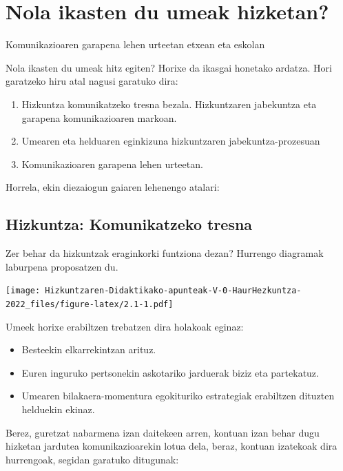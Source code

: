 \documentclass[
]{book}
\providecommand{\tightlist}{%
  \setlength{\itemsep}{0pt}\setlength{\parskip}{0pt}}
\begin{document}
\hypertarget{nola-ikasten-du-umeak-hizketan}{%
\chapter{Nola ikasten du umeak hizketan?}\label{nola-ikasten-du-umeak-hizketan}}

Komunikazioaren garapena lehen urteetan etxean eta eskolan

Nola ikasten du umeak hitz egiten? Horixe da ikasgai honetako ardatza. Hori garatzeko hiru atal nagusi garatuko dira:

\begin{enumerate}
\def\labelenumi{\arabic{enumi}.}
\tightlist
\item
  Hizkuntza komunikatzeko tresna bezala. Hizkuntzaren jabekuntza eta garapena komunikazioaren markoan.
\item
  Umearen eta helduaren eginkizuna hizkuntzaren jabekuntza-prozesuan
\item
  Komunikazioaren garapena lehen urteetan.
\end{enumerate}

Horrela, ekin diezaiogun gaiaren lehenengo atalari:

\hypertarget{hizkuntza-komunikatzeko-tresna}{%
\section{Hizkuntza: Komunikatzeko tresna}\label{hizkuntza-komunikatzeko-tresna}}

Zer behar da hizkuntzak eraginkorki funtziona dezan? Hurrengo diagramak laburpena proposatzen du.

\texttt{[image: Hizkuntzaren-Didaktikako-apunteak-V-0-HaurHezkuntza-2022\_files/figure-latex/2.1-1.pdf]}

Umeek horixe erabiltzen trebatzen dira holakoak eginaz:

\begin{itemize}
\tightlist
\item
  Besteekin elkarrekintzan arituz.
\item
  Euren inguruko pertsonekin askotariko jarduerak biziz eta partekatuz.
\item
  Umearen bilakaera-momentura egokituriko estrategiak erabiltzen dituzten helduekin ekinaz.
\end{itemize}

Berez, guretzat nabarmena izan daitekeen arren, kontuan izan behar dugu hizketan jardutea komunikazioarekin lotua dela, beraz, kontuan izatekoak dira hurrengoak, segidan garatuko ditugunak:
\end{document}
